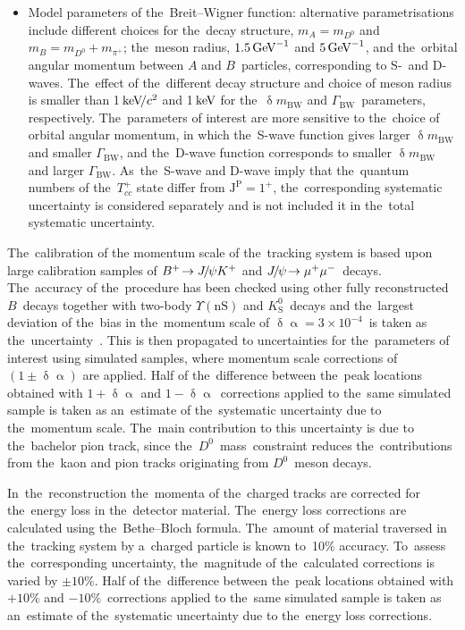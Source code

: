 \documentclass[12pt,a4paper]{article}
\def\Pmu         {\ensuremath{\upmu}\xspace}
\def\Ppi         {\ensuremath{\uppi}\xspace}
\def\Ppsi        {\ensuremath{\uppsi}\xspace}
\def\PUpsilon    {\ensuremath{\Upsilon}\xspace}
\def\PA      {\ensuremath{\mathrm{A}}\xspace}
\def\PB      {\ensuremath{\mathrm{B}}\xspace}
\def\PD      {\ensuremath{\mathrm{D}}\xspace}
\def\PJ      {\ensuremath{\mathrm{J}}\xspace}
\def\PK      {\ensuremath{\mathrm{K}}\xspace}
\def\PT      {\ensuremath{\mathrm{T}}\xspace}
\def\Pc      {\ensuremath{\mathrm{c}}\xspace}
\def\Pmu         {\ensuremath{\mu}\xspace}
\def\Ppi         {\ensuremath{\pi}\xspace}
\def\Ppsi        {\ensuremath{\psi}\xspace}
\def\PA      {\ensuremath{A}\xspace}
\def\PB      {\ensuremath{B}\xspace}
\def\PD      {\ensuremath{D}\xspace}
\def\PJ      {\ensuremath{J}\xspace}
\def\PK      {\ensuremath{K}\xspace}
\def\PT      {\ensuremath{T}\xspace}
\def\Pc      {\ensuremath{c}\xspace}
\def\mumu       {{\ensuremath{\Pmu^+\Pmu^-}}\xspace}
\def\cquark    {{\ensuremath{\Pc}}\xspace}
\def\pion   {{\ensuremath{\Ppi}}\xspace}
\def\pip    {{\ensuremath{\pion^+}}\xspace}
\def\kaon    {{\ensuremath{\PK}}\xspace}
\def\Kp      {{\ensuremath{\kaon^+}}\xspace}
\def\KS      {{\ensuremath{\kaon^0_{\mathrm{S}}}}\xspace}
\def\D       {{\ensuremath{\PD}}\xspace}
\def\Dz      {{\ensuremath{\D^0}}\xspace}
\def\B       {{\ensuremath{\PB}}\xspace}
\def\Bu      {{\ensuremath{\B^+}}\xspace}
\def\jpsi     {{\ensuremath{{\PJ\mskip -3mu/\mskip -2mu\Ppsi}}}\xspace}
\newcommand{\decay}[2]{\ensuremath{#1\!\to #2}\xspace}
\def\to                 {\ensuremath{\rightarrow}\xspace}
\newcommand{\aunit}[1]{\ensuremath{\text{\,#1}}}
\newcommand{\gev}{\aunit{Ge\kern -0.1em V}\xspace}
\newcommand{\kev}{\aunit{ke\kern -0.1em V}\xspace}
\def\Tcc {{{\ensuremath{\PT_{\cquark\cquark}^+}}}\xspace}
\newcommand{\kevcc}{\ensuremath{\aunit{ke\kern -0.1em V\!/}c^2}\xspace}
\begin{document}
\begin{itemize}
\item Model parameters 
of the~Breit\nobreakdash--Wigner function: 
alternative parametrisations include 
different choices 
for the~decay structure, 
$m_{\PA}=m_{\Dz}$ and $m_{\PB}=m_{\Dz}+m_{\pip}$; 
the~meson 
radius, $1.5\gev^{-1}$ and $5\gev^{-1}$,
and the~orbital angular momentum 
between $\PA$ 
and $\PB$~particles, 
corresponding to S-~and D\nobreakdash-waves.
The~effect of the~different decay structure and 
choice of meson radius
is smaller than 1\kevcc and 1\kev
for the~$\updelta m_{\mathrm{BW}}$
and $\Gamma_{\mathrm{BW}}$~parameters, respectively. 
The~parameters of interest are more sensitive to the~choice
of orbital angular momentum, 
in which the~S\nobreakdash-wave 
function gives larger $\updelta m_{\mathrm{BW}}$
and smaller $\Gamma_{\mathrm{BW}}$, 
and the~D\nobreakdash-wave function 
corresponds to 
smaller $\updelta m_{\mathrm{BW}}$
and larger $\Gamma_{\mathrm{BW}}$.
As~the~S\nobreakdash-wave and 
D\nobreakdash-wave imply 
that the~quantum numbers of 
the~\Tcc state differ from $\mathrm{J^P=1^+}$,
the~corresponding systematic 
uncertainty is considered separately 
and is not included  
it in the~total systematic uncertainty.

\end{itemize} 

The~calibration of the momentum scale of 
the~tracking system 
is based upon large calibration 
samples of  \mbox{$\decay{\Bu}{\jpsi\Kp}$} 
and  
\mbox{$\decay{\jpsi}
{\mumu}$}~decays. The~accuracy of the~procedure has been checked 
using other fully reconstructed $\B$~decays together 
with two\nobreakdash-body
$\PUpsilon(\mathrm{nS})$ and 
$\KS$~decays and 
the~largest deviation of the~bias 
in the~momentum  scale
of $\updelta\upalpha=3\times10^{-4}$~is 
taken as the~uncertainty~\cite{LHCb-PAPER-2013-011}.
This is then propagated to uncertainties for 
the~parameters of  interest using simulated samples,
where momentum scale corrections 
of $\left(1\pm\updelta\upalpha\right)$
are applied. Half of the~difference 
between the~peak locations obtained 
with $1+\updelta\upalpha$ 
and $1-\updelta\upalpha$~corrections 
applied to 
the~same simulated sample
is taken as an~estimate of the~systematic 
uncertainty due 
to the~momentum scale. 
The~main contribution to this uncertainty 
is due to the~bachelor pion track, 
since  the~\Dz~mass~constraint
reduces the~contributions from 
the~kaon and pion tracks originating 
from \Dz~meson decays.


In~the~reconstruction the~momenta 
of the~charged tracks 
are corrected for the~energy loss in the~detector 
material. 
The~energy loss corrections are calculated  
using  the~Bethe\nobreakdash--Bloch
formula. The~amount of material traversed in the~tracking
system by a~charged particle 
is known to~10\% accuracy.  To~assess the~corresponding uncertainty, 
the~magnitude of the~calculated corrections 
is varied by $\pm10\%$.
Half of the~difference 
between the~peak locations obtained with $+10\%$ 
and $-10\%$~corrections applied to the~same simulated sample
is taken as an~estimate of the~systematic 
uncertainty due to the~energy loss corrections. 
\end{document}
